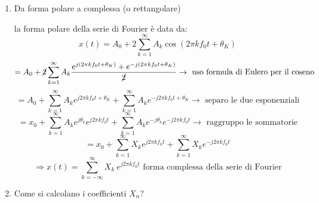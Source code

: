\documentclass[
  paper=a4,
  ,captions=tableheading
]{scrartcl}
\begin{document}
\begin{enumerate}
\def\labelenumi{\arabic{enumi}.}
\setcounter{enumi}{1}
\item
  Da forma polare a complessa (o rettangolare)

  la forma polare della serie di Fourier è data da: \[
   x(t) = A_0 + 2 \sum_{k=1}^{\infty} A_{k} \cos (2\pi kf_{0}t + \theta_{K})
   \] \[
   = A_0 + \cancel{2} \sum_{k=1}^{\infty} A_{k} \frac{e^{j(2\pi kf_{0}t + \theta_{K})}+e^{-j(2\pi kf_{0}t + \theta_{K})}}{\cancel{2}} \to \text{ uso formula di Eulero per il coseno}
   \] \[
   = A_0 + \sum_{k=1}^{\infty} A_{k} e^{j2\pi kf_{0}t + \theta_{K}}  + \sum_{k=1}^{\infty} A_{k} e^{-j2\pi kf_{0}t + \theta_{K}} \to \text{ separo le due esponenziali}
   \] \[
   = x_0 + \sum_{k=1}^{\infty} A_{k} e^{j\theta_{k}} e^{j2\pi kf_{0}t}  + \sum_{k=1}^{\infty} A_{k} e^{-j\theta_{k}} e^{-j2\pi kf_{0}t}  \to \text{ raggruppo le sommatorie}
   \] \[
   = x_0 + \sum_{k=1}^{\infty} X_k e^{j2\pi kf_{0}t}  + \sum_{k=1}^{\infty} X_k e^{-j2\pi kf_{0}t}
   \] \[
   \Rightarrow x(t) = \sum_{k=-\infty}^{\infty} X_k \ e^{j2\pi kf_{0}t} \text{ forma complessa della serie di Fourier}
   \]
\item
  Come si calcolano i coefficienti \(X_n\)?


\end{enumerate}
\end{document}
